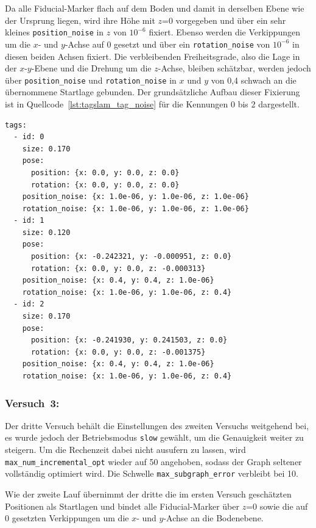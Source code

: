 Da alle Fiducial-Marker flach auf dem Boden und damit in derselben Ebene wie der Ursprung liegen, wird ihre Höhe mit $z$=0 vorgegeben und über ein sehr kleines \texttt{position\_noise} in $z$ von $10^{-6}$ fixiert.
Ebenso werden die Verkippungen um die $x$- und $y$-Achse auf 0 gesetzt und über ein \texttt{rotation\_noise} von $10^{-6}$ in diesen beiden Achsen fixiert.
Die verbleibenden Freiheitsgrade, also die Lage in der $x$-$y$-Ebene und die Drehung um die $z$-Achse, bleiben schätzbar, werden jedoch über \texttt{position\_noise} und \texttt{rotation\_noise} in $x$ und $y$ von 0,4 schwach an die übernommene Startlage gebunden.
Der grundsätzliche Aufbau dieser Fixierung ist in Quellcode~\ref{lst:tagslam_tag_noise} für die Kennungen 0 bis 2 dargestellt.
\begin{lstlisting}[caption={Tagweise Fixierung der Markerlagen in \texttt{tagslam.yaml}},label={lst:tagslam_tag_noise},captionpos=b]
tags:
  - id: 0
    size: 0.170
    pose:
      position: {x: 0.0, y: 0.0, z: 0.0}
      rotation: {x: 0.0, y: 0.0, z: 0.0}
    position_noise: {x: 1.0e-06, y: 1.0e-06, z: 1.0e-06}
    rotation_noise: {x: 1.0e-06, y: 1.0e-06, z: 1.0e-06}
  - id: 1
    size: 0.120
    pose:
      position: {x: -0.242321, y: -0.000951, z: 0.0}
      rotation: {x: 0.0, y: 0.0, z: -0.000313}
    position_noise: {x: 0.4, y: 0.4, z: 1.0e-06}
    rotation_noise: {x: 1.0e-06, y: 1.0e-06, z: 0.4}
  - id: 2
    size: 0.170
    pose:
      position: {x: -0.241930, y: 0.241503, z: 0.0}
      rotation: {x: 0.0, y: 0.0, z: -0.001375}
    position_noise: {x: 0.4, y: 0.4, z: 1.0e-06}
    rotation_noise: {x: 1.0e-06, y: 1.0e-06, z: 0.4}
\end{lstlisting}


\subsubsection*{Versuch~3:}
Der dritte Versuch behält die Einstellungen des zweiten Versuchs weitgehend bei, es wurde jedoch der Betriebsmodus \texttt{slow} gewählt, um die Genauigkeit weiter zu steigern.
Um die Rechenzeit dabei nicht ausufern zu lassen, wird \texttt{max\_num\_incremental\_opt} wieder auf 50 angehoben, sodass der Graph seltener vollständig optimiert wird.
Die Schwelle \texttt{max\_subgraph\_error} verbleibt bei 10.

Wie der zweite Lauf übernimmt der dritte die im ersten Versuch geschätzten Positionen als Startlagen und bindet 
alle Fiducial-Marker über $z$=0 sowie die auf 0 gesetzten Verkippungen um die $x$- und $y$-Achse an die Bodenebene.

